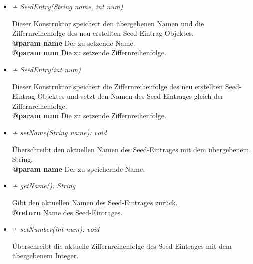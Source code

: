         \begin{itemize}
            \item \textit{+ SeedEntry(String name, int num)}
                \begin{leftbar}[0.9\linewidth]
                    Dieser Konstruktor speichert den übergebenen Namen und die 
                    Ziffernreihenfolge des neu erstellten Seed-Eintrag Objektes.\\
                    \textbf{@param name} Der zu setzende Name.\\
                    \textbf{@param num} Die zu setzende Ziffernreihenfolge.\\
                \end{leftbar}
            \item \textit{+ SeedEntry(int num)}
                \begin{leftbar}[0.9\linewidth]
                    Dieser Konstruktor speichert die Ziffernreihenfolge des neu 
                    erstellten Seed-Eintrag Objektes und setzt den Namen des 
                    Seed-Eintrages gleich der Ziffernreihenfolge.\\
                    \textbf{@param num} Die zu setzende Ziffernreihenfolge.\\
                \end{leftbar}
            \item \textit{+ setName(String name): void}
                \begin{leftbar}[0.9\linewidth]
                    Überschreibt den aktuellen Namen des Seed-Eintrages mit 
                    dem übergebenem String.\\
                    \textbf{@param name} Der zu speichernde Name.
                \end{leftbar}
            \item \textit{+ getName(): String}
                \begin{leftbar}[0.9\linewidth]
                    Gibt den aktuellen Namen des Seed-Eintrages zurück.\\
                    \textbf{@return} Name des Seed-Eintrages.
                \end{leftbar}
            \item \textit{+ setNumber(int num): void}
                \begin{leftbar}[0.9\linewidth]
                    Überschreibt die aktuelle Ziffernreihenfolge des Seed-Eintrages mit 
                    dem übergebenem Integer.\\

\end{leftbar}
\end{itemize}
